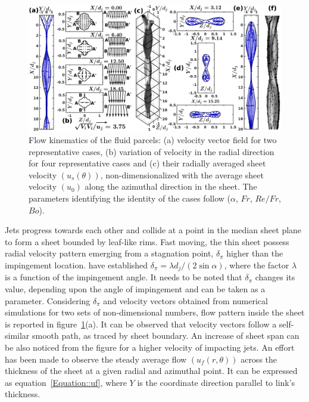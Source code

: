 \documentclass[%
 aip,
 sd,%
amsmath,amssymb,
preprint,%
author-year,%
]{revtex4-1}
\begin{document}
\begin{figure}
	\centering
	\includegraphics[width=\linewidth]{Figure5}
	\caption{Flow kinematics of the fluid parcels: (a) velocity vector field for two representative cases, (b) variation of velocity in the radial direction for four representative cases and (c) their radially averaged sheet velocity $\left(u_s(\theta)\right)$, non-dimensionalized with the average sheet velocity $\left(u_0\right)$ along the azimuthal direction in the sheet. The parameters identifying the identity of the cases follow ($\alpha$, $Fr$, $Re/Fr$, $Bo$).}
	\label{Figure::velocityVectors}%
\end{figure}
Jets progress towards each other and collide at a point in the median sheet plane to form a sheet bounded by leaf-like rims. Fast moving, the thin sheet possess radial velocity pattern emerging from a stagnation point, $\delta_\pi$ higher than the impingement location. \cite{inamura2014effect} have established $\delta_\pi = \lambda d_j/(2\sin\alpha)$, where the factor $\lambda$ is a function of the impingement angle. It needs to be noted that $\delta_\pi$ changes its value, depending upon the angle of impingement and can be taken as a parameter. Considering $\delta_\pi$ and velocity vectors obtained from numerical simulations for two sets of non-dimensional numbers, flow pattern inside the sheet is reported in figure~\ref{Figure::velocityVectors}(a). It can be observed that velocity vectors follow a self-similar smooth path, as traced by sheet boundary. An increase of sheet span can be also noticed from the figure for a higher velocity of impacting jets. An effort has been made to observe the steady average flow $\left(u_f(r,\theta)\right)$ across the thickness of the sheet at a given radial and azimuthal point. It can be expressed as equation~\ref{Equation::uf}, where $Y$ is the coordinate direction parallel to link's thickness. 
\end{document}
